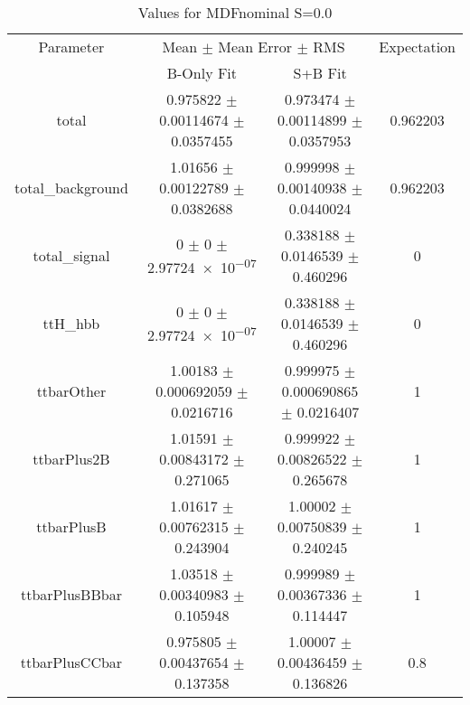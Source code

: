 \begin{table}
\centering
\caption{Values for MDFnominal S=0.0}
\begin{tabular}{cccc}
\toprule
Parameter & \multicolumn{2}{c}{Mean $\pm$ Mean Error $\pm$ RMS} & Expectation\\
 & B-Only Fit & S+B Fit & \\
\midrule
total & \num{0.975822} $\pm$ \num{0.00114674} $\pm$ \num{0.0357455} & \num{0.973474} $\pm$ \num{0.00114899} $\pm$ \num{0.0357953} & \num{0.962203}\\
total\_background & \num{1.01656} $\pm$ \num{0.00122789} $\pm$ \num{0.0382688} & \num{0.999998} $\pm$ \num{0.00140938} $\pm$ \num{0.0440024} & \num{0.962203}\\
total\_signal & \num{0} $\pm$ \num{0} $\pm$ \num{2.97724e-07} & \num{0.338188} $\pm$ \num{0.0146539} $\pm$ \num{0.460296} & \num{0}\\
ttH\_hbb & \num{0} $\pm$ \num{0} $\pm$ \num{2.97724e-07} & \num{0.338188} $\pm$ \num{0.0146539} $\pm$ \num{0.460296} & \num{0}\\
ttbarOther & \num{1.00183} $\pm$ \num{0.000692059} $\pm$ \num{0.0216716} & \num{0.999975} $\pm$ \num{0.000690865} $\pm$ \num{0.0216407} & \num{1}\\
ttbarPlus2B & \num{1.01591} $\pm$ \num{0.00843172} $\pm$ \num{0.271065} & \num{0.999922} $\pm$ \num{0.00826522} $\pm$ \num{0.265678} & \num{1}\\
ttbarPlusB & \num{1.01617} $\pm$ \num{0.00762315} $\pm$ \num{0.243904} & \num{1.00002} $\pm$ \num{0.00750839} $\pm$ \num{0.240245} & \num{1}\\
ttbarPlusBBbar & \num{1.03518} $\pm$ \num{0.00340983} $\pm$ \num{0.105948} & \num{0.999989} $\pm$ \num{0.00367336} $\pm$ \num{0.114447} & \num{1}\\
ttbarPlusCCbar & \num{0.975805} $\pm$ \num{0.00437654} $\pm$ \num{0.137358} & \num{1.00007} $\pm$ \num{0.00436459} $\pm$ \num{0.136826} & \num{0.8}\\
\bottomrule
\end{tabular}
\end{table}